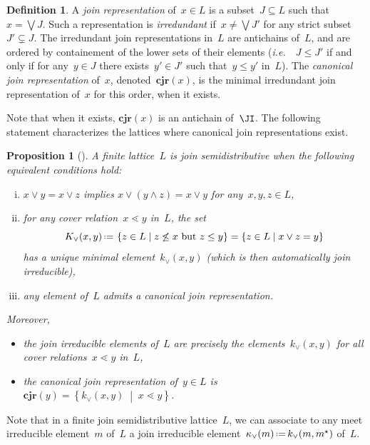 \documentclass{amsart}
\newtheorem{proposition}[theorem]{Proposition}
\theoremstyle{definition}
\newtheorem{definition}[theorem]{Definition}
\newcommand{\set}[2]{\left\{ #1 \;\middle|\; #2 \right\}} %
\newcommand{\eqdef}{\mbox{\,\raisebox{0.2ex}{\scriptsize\ensuremath{\mathrm:}}\ensuremath{=}\,}} %
\newcommand{\ie}{\textit{i.e.}~} %
\newcommand{\darkblue}{\color{darkblue}} %
\newcommand{\defn}[1]{\textsl{\darkblue #1}} %
\newcommand{\meet}{\wedge} %
\newcommand{\join}{\vee} %
\newcommand{\bigJoin}{\bigvee} %
\newcommand{\CJR}{\mathbf{cjr}} %
\begin{document}
\begin{definition}
A \defn{join representation} of~$x \in L$ is a subset~${J \subseteq L}$ such that~$x = \bigJoin J$.
Such a representation is \defn{irredundant} if~$x \ne \bigJoin J'$ for any strict subset~$J' \subsetneq J$.
The irredundant join representations in~$L$ are antichains of~$L$, and are ordered by containement of the lower sets of their elements (\ie~$J \le J'$ if and only if for any~$y \in J$ there exists~$y' \in J'$ such that~$y \le y'$ in~$L$).
The \defn{canonical join representation} of~$x$, denoted~$\CJR(x)$, is the minimal irredundant join representation of~$x$ for this order, when it exists.
\end{definition}

Note that when it exists, $\CJR(x)$ is an antichain of~$\JI$.
The following statement characterizes the lattices where canonical join representations exist.

\begin{proposition}[{\cite[Thm.~2.24 \& Thm.~2.56]{FreeseNation}}]
\label{prop:semidistributive}
A finite lattice~$L$ is \defn{join semidistributive} when the following equivalent conditions hold:
\begin{enumerate}[(i)]
\item $x \join y = x \join z$ implies $x \join (y \meet z) = x \join y$ for any~$x, y, z \in L$,
\item for any cover relation~$x \lessdot y$ in~$L$, the set \[K_\join(x,y) \eqdef \set{z \in L}{z \not\le x \text{ but } z \le y} = \set{z \in L}{x \join z = y}\] has a unique minimal element~$k_\join(x,y)$ (which is then automatically join irreducible),
\item any element of~$L$ admits a canonical join representation.
\end{enumerate}
Moreover, 
\begin{itemize}
\item the join irreducible elements of~$L$ are precisely the elements~$k_\join(x,y)$ for all cover relations~$x \lessdot y$ in~$L$,
\item the canonical join representation of~$y \in L$ is~$\CJR(y) = \set{k_\join(x, y)}{x \lessdot y}$.
\end{itemize}
\end{proposition}

Note that in a finite join semidistributive lattice~$L$, we can associate to any meet irreducible element~$m$ of~$L$ a join irreducible element~$\kappa_\join(m) \eqdef k_\join(m, m^\star)$ of~$L$.
\end{document}
